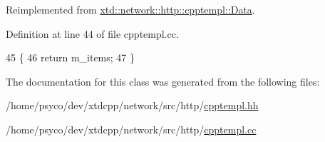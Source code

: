 Reimplemented from \hyperlink{classxtd_1_1network_1_1http_1_1cpptempl_1_1Data_a39713cc7cdc05a2375c1c5d4f00772db}{xtd\+::network\+::http\+::cpptempl\+::\+Data}.



Definition at line 44 of file cpptempl.\+cc.


\begin{DoxyCode}
45 \{
46   \textcolor{keywordflow}{return} m\_items;
47 \}
\end{DoxyCode}


The documentation for this class was generated from the following files\+:\begin{DoxyCompactItemize}
\item 
/home/psyco/dev/xtdcpp/network/src/http/\hyperlink{cpptempl_8hh}{cpptempl.\+hh}\item 
/home/psyco/dev/xtdcpp/network/src/http/\hyperlink{cpptempl_8cc}{cpptempl.\+cc}\end{DoxyCompactItemize}
